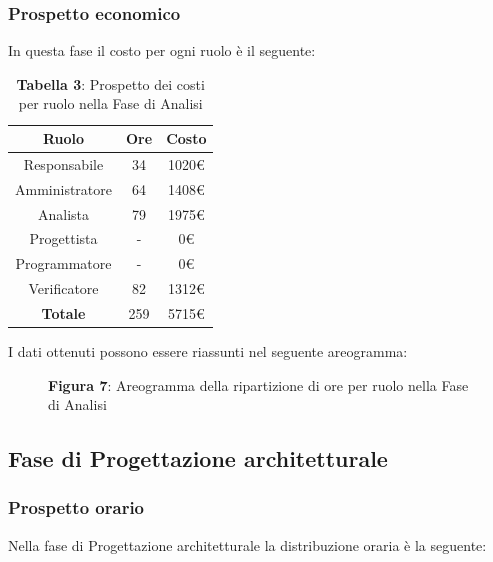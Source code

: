 \subsubsection{Prospetto economico}
In questa fase il costo per ogni ruolo è il seguente:

\begin{table}[H]
	\centering
	\renewcommand{\arraystretch}{1.5}
	\begin{tabular}{|c|c|c|}
		\hline
		\rowcolor{lighter-grayer}
Ruolo & Ore & Costo \\ \hline
Responsabile & 34 & 1020\euro \\ \hline
Amministratore & 64 & 1408\euro \\ \hline
Analista & 79 & 1975\euro \\ \hline
Progettista & - & 0\euro \\ \hline
Programmatore & - & 0\euro \\ \hline
Verificatore & 82 & 1312\euro \\ \hline
\textbf{Totale} & 259 & 5715\euro \\ \hline
\end{tabular}
	\caption*{\textbf{Tabella 3}: Prospetto dei costi per ruolo nella Fase di Analisi\\}
\end{table}
I dati ottenuti possono essere riassunti nel seguente areogramma:
\begin{figure}[H]
	\centering
	\caption*{\textbf{Figura 7}:  Areogramma della ripartizione di ore per ruolo nella Fase di Analisi}
	\label{fig:Figura3}
\end{figure}	



\subsection{Fase di Progettazione architetturale}
\subsubsection{Prospetto orario}
Nella fase di Progettazione architetturale la distribuzione oraria è la seguente:


